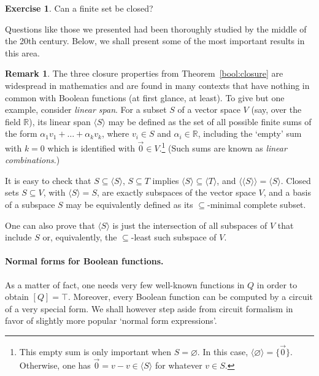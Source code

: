 \documentclass[12pt,notitlepage]{article}
\theoremstyle{plain}
\theoremstyle{definition}
\newtheorem{exc}[thm]{Exercise}
\newtheorem{rem}[thm]{Remark}
\theoremstyle{plain}
\newcommand{\R}{\mathbb{R}}
\newcommand{\sbs}{\subseteq}
\newcommand{\void}{\varnothing}
\newcommand{\1}{\mathbf{1}}
\newcommand{\0}{\mathbf{0}}
\newcommand{\mcomm}[1]{}
\begin{document}
\begin{exc}
Can a finite set be closed?
\end{exc}

Questions like those we presented had been thoroughly studied by the middle of the 20th century. Below, we shall present some of the most important results in this area.

\begin{rem}
The three closure properties from Theorem~\ref{bool:closure} are widespread in mathematics and are found in many contexts that have nothing in common with Boolean functions (at first glance, at least). To give but one example, consider \emph{linear span}. For a subset $S$ of a vector space $V$ (say, over the field $\R$), its linear span $\langle S \rangle$ may be defined as the set of all possible finite sums of the form $\alpha_1 v_1 + \ldots + \alpha_k v_k$, where $v_i \in S$ and $\alpha_i \in \R$, including the `empty' sum with $k = 0$ which is identified with $\vec 0 \in V$.\footnote{This empty sum is only important when $S = \void$. In this case, $\langle \void \rangle = \{\vec 0\}$. Otherwise, one has $\vec 0 = v - v \in \langle S \rangle$ for whatever $v \in S$.} (Such sums are known as \emph{linear combinations}.)

It is easy to check that $S \sbs \langle S \rangle$, $S \sbs T$ implies $\langle S \rangle \sbs \langle T \rangle$, and $\langle \langle S \rangle \rangle = \langle S \rangle$. Closed sets $S \sbs V$, with $\langle S \rangle = S$, are exactly subspaces of the vector space $V$, and a basis of a subspace $S$ may be equivalently defined as its ${\sbs}$-minimal complete subset.

One can also prove that $\langle S \rangle$ is just the intersection of all subspaces of $V$ that include $S$ or, equivalently, the ${\sbs}$-least such subspace of $V$.
\end{rem}

\mcomm{The Instructor might wish to give more examples of this kind like topological or deductive closures.}

\paragraph{Normal forms for Boolean functions.} As a matter of fact, one needs very few well-known functions in $Q$ in order to obtain $[Q] = \top$. Moreover, every Boolean function can be computed by a circuit of a very special form. We shall however step aside from circuit formalism in favor of slightly more popular `normal form expressions'.
\end{document}
